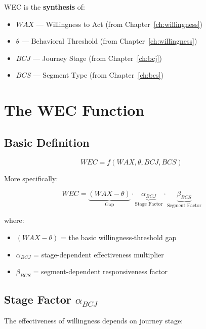 WEC is the \textbf{synthesis} of:
\begin{itemize}
    \item $WAX$ — Willingness to Act (from Chapter~\ref{ch:willingness})
    \item $\theta$ — Behavioral Threshold (from Chapter~\ref{ch:willingness})
    \item $BCJ$ — Journey Stage (from Chapter~\ref{ch:bcj})
    \item $BCS$ — Segment Type (from Chapter~\ref{ch:bcs})
\end{itemize}

\section{The WEC Function}

\subsection{Basic Definition}

\begin{equation}
WEC = f(WAX, \theta, BCJ, BCS)
\end{equation}

More specifically:

\begin{equation}
WEC = \underbrace{(WAX - \theta)}_{\text{Gap}} \cdot 
      \underbrace{\alpha_{BCJ}}_{\text{Stage Factor}} \cdot 
      \underbrace{\beta_{BCS}}_{\text{Segment Factor}}
\end{equation}

where:
\begin{itemize}
    \item $(WAX - \theta)$ = the basic willingness-threshold gap
    \item $\alpha_{BCJ}$ = stage-dependent effectiveness multiplier
    \item $\beta_{BCS}$ = segment-dependent responsiveness factor
\end{itemize}

\subsection{Stage Factor $\alpha_{BCJ}$}

The effectiveness of willingness depends on journey stage:

